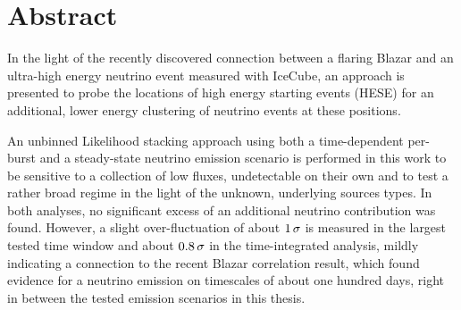 \thispagestyle{plain}

\section*{Abstract}
In the light of the recently discovered connection between a flaring Blazar and an ultra-high energy neutrino event measured with IceCube, an approach is presented to probe the locations of high energy starting events (HESE) for an additional, lower energy clustering of neutrino events at these positions.

An unbinned Likelihood stacking approach using both a time-dependent per-burst and a steady-state neutrino emission scenario is performed in this work to be sensitive to a collection of low fluxes, undetectable on their own and to test a rather broad regime in the light of the unknown, underlying sources types.
In both analyses, no significant excess of an additional neutrino contribution was found.
However, a slight over-fluctuation of about $\num{1}\,\sigma$ is measured in the largest tested time window and about $\num{0.8}\,\sigma$ in the time-integrated analysis, mildly indicating a connection to the recent Blazar correlation result, which found evidence for a neutrino emission on timescales of about one hundred days, right in between the tested emission scenarios in this thesis.

